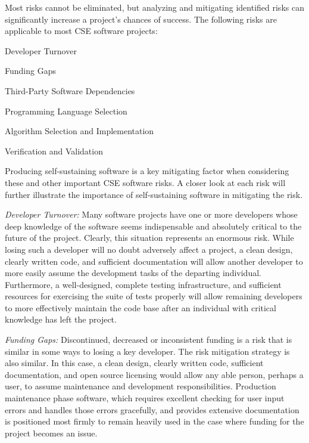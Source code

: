 \documentclass[11pt]{SANDreport}
\begin{document}
Most risks cannot be eliminated, but analyzing and mitigating
identified risks can significantly increase a project's chances of
success.  The following risks are applicable to most CSE software
projects:

\begin{compactitem}

{}\item Developer Turnover

{}\item Funding Gaps

{}\item Third-Party Software Dependencies

{}\item Programming Language Selection

{}\item Algorithm Selection and Implementation

{}\item Verification and Validation

\end{compactitem}

Producing self-sustaining software is a key mitigating factor when
considering these and other important CSE software risks.  A closer
look at each risk will further illustrate the importance of
self-sustaining software in mitigating the risk.

{}\textit{Developer Turnover:} Many software projects have one or more
developers whose deep knowledge of the software seems indispensable
and absolutely critical to the future of the project.  Clearly, this
situation represents an enormous risk.  While losing such a developer
will no doubt adversely affect a project, a clean design, clearly
written code, and sufficient documentation will allow another
developer to more easily assume the development tasks of the departing
individual.  Furthermore, a well-designed, complete testing
infrastructure, and sufficient resources for exercising the suite of
tests properly will allow remaining developers to more effectively
maintain the code base after an individual with critical knowledge has
left the project.

{}\textit{Funding Gaps:} Discontinued, decreased or inconsistent
funding is a risk that is similar in some ways to losing a key
developer.  The risk mitigation strategy is also similar.  In this
case, a clean design, clearly written code, sufficient documentation,
and open source licensing would allow any able person, perhaps a user,
to assume maintenance and development responsibilities.  Production
maintenance phase software, which requires excellent checking for user
input errors and handles those errors gracefully, and provides
extensive documentation is positioned most firmly to remain heavily
used in the case where funding for the project becomes an issue.
\end{document}
